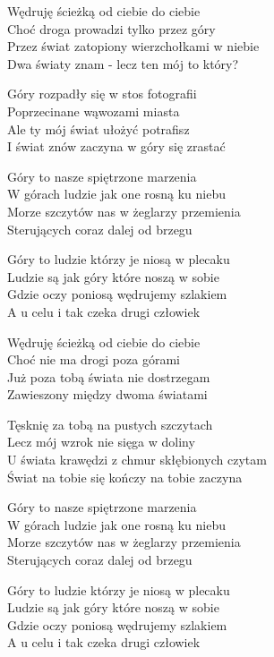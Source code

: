 \begin{text}
Wędruję ścieżką od ciebie do ciebie\\
Choć droga prowadzi tylko przez góry\\
Przez świat zatopiony wierzchołkami w niebie\\
Dwa światy znam - lecz ten mój to który?

Góry rozpadły się w stos fotografii\\
Poprzecinane wąwozami miasta\\
Ale ty mój świat ułożyć potrafisz\\
I świat znów zaczyna w góry się zrastać

Góry to nasze spiętrzone marzenia\\
W górach ludzie jak one rosną ku niebu\\
Morze szczytów nas w żeglarzy przemienia\\
Sterujących coraz dalej od brzegu

Góry to ludzie którzy je niosą w plecaku\\
Ludzie są jak góry które noszą w sobie\\
Gdzie oczy poniosą wędrujemy szlakiem\\
A u celu i tak czeka drugi człowiek

Wędruję ścieżką od ciebie do ciebie\\
Choć nie ma drogi poza górami\\
Już poza tobą świata nie dostrzegam\\
Zawieszony między dwoma światami

Tęsknię za tobą na pustych szczytach\\
Lecz mój wzrok nie sięga w doliny\\
U świata krawędzi z chmur skłębionych czytam\\
Świat na tobie się kończy na tobie zaczyna

Góry to nasze spiętrzone marzenia\\
W górach ludzie jak one rosną ku niebu\\
Morze szczytów nas w żeglarzy przemienia\\
Sterujących coraz dalej od brzegu

Góry to ludzie którzy je niosą w plecaku\\
Ludzie są jak góry które noszą w sobie\\
Gdzie oczy poniosą wędrujemy szlakiem\\
A u celu i tak czeka drugi człowiek
\end{text}

